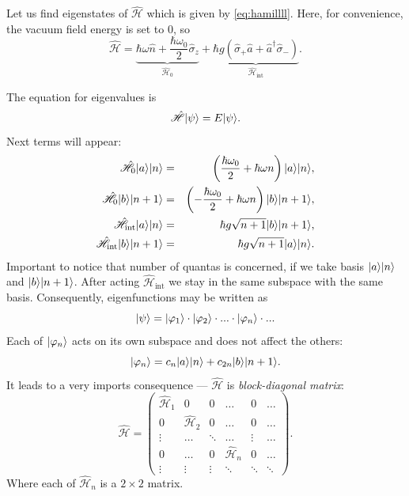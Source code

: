 Let us find eigenstates of $\hat{\mathscr{H}}$ which is given by \eqref{eq:hamillll}. Here, for convenience, the vacuum field energy is set to $0$, so
\begin{equation}
	\hat{\mathscr{H}} = \underbrace{\hbar \omega  \hat{n} + \frac{\hbar \omega_0}{2} \hat{\sigma}_z}_{\hat{\mathscr{H}}_0} + \underbrace{\hbar g \left( \hat{\sigma}_+\hat{a} + \hat{a}^{\dagger} \hat{\sigma}_- \right)}_{\hat{\mathscr{H}}_{\text{int}}}.
\end{equation}

The equation for eigenvalues is 
\begin{equation}
\hat{\mathscr{H}} \lvert\psi\rangle = E \lvert\psi\rangle.
\label{eq:eigen} 
\end{equation}
Next terms will appear:
\begin{eqnarray}
	\hat{\mathscr{H}}_0 \lvert a\rangle \lvert n\rangle &=& \left( \frac{\hbar \omega_0}{2} + \hbar \omega n \right) \lvert a\rangle \lvert n\rangle, \\
	\hat{\mathscr{H}}_0 \lvert b\rangle \lvert n+1\rangle &=& \left( -\frac{\hbar \omega_0}{2} + \hbar \omega n \right) \lvert b\rangle \lvert n+1\rangle, \\
	\hat{\mathscr{H}}_{\text{int}} \lvert a\rangle \lvert n\rangle &=& \hbar g \sqrt{n+1} \lvert b\rangle \lvert n+1\rangle, \\
	\hat{\mathscr{H}}_{\text{int}} \lvert b\rangle \lvert n+1\rangle &=& \hbar g \sqrt{n+1} \lvert a\rangle \lvert n\rangle.
\end{eqnarray}
Important to notice that number of quantas is concerned, if we take  basis $\lvert a\rangle \lvert n\rangle$ and $\lvert b\rangle \lvert n+1\rangle$. After acting $\hat{\mathscr{H}}_{\text{int}}$ we stay in the same subspace with the same basis. Consequently, eigenfunctions may be written as
\begin{equation}
	\lvert\psi\rangle = \lvert\varphi_1\rangle \cdot \lvert\varphi_2\rangle \cdot ... \cdot \lvert\varphi_n\rangle \cdot ...
\end{equation}
Each of $\lvert\varphi_n\rangle$ acts on its own subspace and does not affect the others:
\begin{equation}
	\lvert\varphi_n\rangle = c_n \lvert a\rangle \lvert n\rangle + c_{2n} \lvert b\rangle \lvert n+1\rangle.
\end{equation}
It leads to a very imports consequence --- $\hat{\mathscr{H}}$ is \textit{block-diagonal matrix}:
\begin{equation}
	\hat{\mathscr{H}} = 
	\begin{pmatrix}
		\hat{\mathcal{H}}_1 & 0 & 0 & \dots & 0 & \dots \\
		0& \hat{\mathcal{H}}_2 &0 & \dots &0 & \dots\\
		\vdots & \dots  & \ddots & \dots & \vdots & \dots \\
		0 & \dots & 0& \hat{\mathcal{H}}_n & 0 & \dots \\
		\vdots & \vdots & \vdots & \ddots & \ddots & \ddots
	\end{pmatrix}.
\end{equation}
Where each of $\hat{\mathcal{H}}_n$ is a $2\times2$ matrix.

